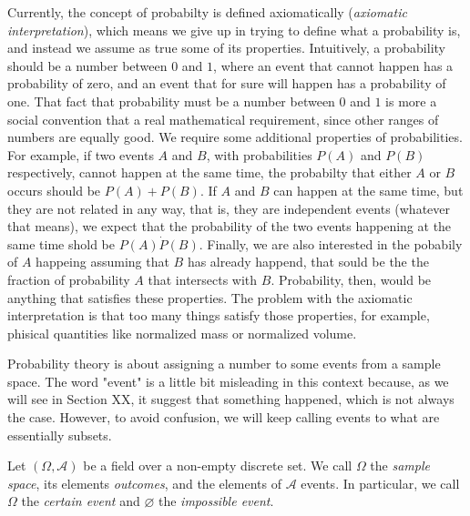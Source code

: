 Currently, the concept of probabilty is defined axiomatically (\emph{axiomatic interpretation}), which means we give up in trying to define what a probability is, and instead we assume as true some of its properties. Intuitively, a probability should be a number between $0$ and $1$, where an event that cannot happen has a probability of zero, and an event that for sure will happen has a probability of one. That fact that probability must be a number between $0$ and $1$ is more a social convention that a real mathematical requirement, since other ranges of numbers are equally good. We require some additional properties of probabilities. For example, if two events $A$ and $B$, with probabilities $P \left( A \right)$ and $P \left( B \right)$ respectively, cannot happen at the same time, the probabilty that either $A$ or $B$ occurs should be $P \left( A \right) + P \left( B \right)$. If $A$ and $B$ can happen at the same time, but they are not related in any way, that is, they are independent events (whatever that means), we expect that the probability of the two events happening at the same time shold be $P \left( A \right) \dot P \left( B \right)$. Finally, we are also interested in the pobabily of $A$ happeing assuming that $B$ has already happend, that sould be the the fraction of probability $A$ that intersects with $B$. Probability, then, would be anything that satisfies these properties. The problem with the axiomatic interpretation is that too many things satisfy those properties, for example, phisical quantities like normalized mass or normalized volume.

Probability theory is about assigning a number to some events from a sample space. The word "event" is a little bit misleading in this context because, as we will see in Section {\color{red} XX}, it suggest that something happened, which is not always the case. However, to avoid confusion, we will keep calling events to what are essentially subsets.

\begin{definition}
Let $\left( \Omega, \mathcal{A} \right)$ be a field over a non-empty discrete set. We call $\Omega$ the \emph{sample space}, its elements \emph{outcomes}, and the elements of $\mathcal{A}$ events. In particular, we call $\Omega$ the \emph{certain event} and $\varnothing$ the \emph{impossible event}.
\end{definition}

